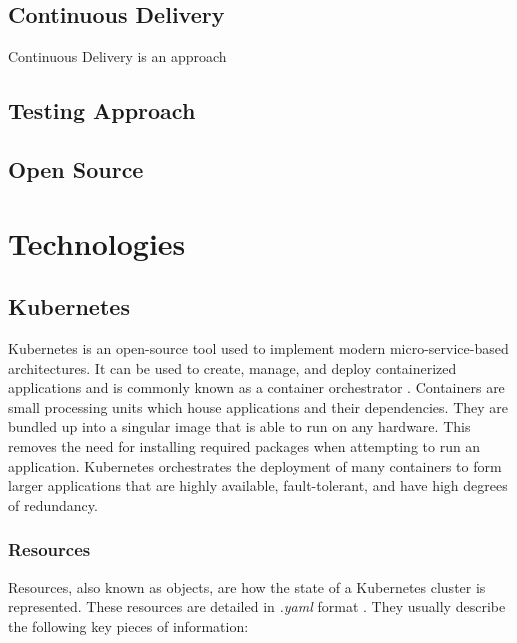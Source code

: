 \documentclass{article}
\begin{document}
\subsection{Continuous Delivery}
Continuous Delivery is an approach 



\subsection{Testing Approach}



\subsection{Open Source}



\section{Technologies} \label{technologies} 



\subsection{Kubernetes}

Kubernetes is an open-source tool used to implement modern micro-service-based architectures. It can be used to create, manage, and deploy containerized applications and is commonly known as a container orchestrator \cite{k8s-overview}. Containers are small processing units which house applications and their dependencies. They are bundled up into a singular image that is able to run on any hardware. This removes the need for installing required packages when attempting to run an application. Kubernetes orchestrates the deployment of many containers to form larger applications that are highly available, fault-tolerant, and have high degrees of redundancy.



\subsubsection{Resources} \label{resources}

Resources, also known as objects, are how the state of a Kubernetes cluster is represented. These resources are detailed in \emph{.yaml} format \cite{k8s-obj}. They usually describe the following key pieces of information:
\end{document}
